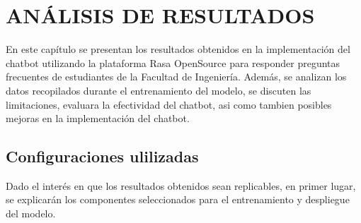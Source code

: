 \chapter[ANÁLISIS]{ANÁLISIS DE RESULTADOS}
En este capítulo se presentan los resultados obtenidos en la implementación del chatbot utilizando
la plataforma Rasa OpenSource para responder preguntas frecuentes de estudiantes de la Facultad de
Ingeniería.  Además, se analizan los datos recopilados durante el entrenamiento del modelo, se
discuten las limitaciones, evaluara la efectividad del chatbot, asi como tambien posibles mejoras
en la implementación del chatbot.

\section{Configuraciones ulilizadas}
Dado el interés en que los resultados obtenidos sean replicables, en primer lugar, se explicarán
los componentes seleccionados para el entrenamiento y despliegue del modelo.

